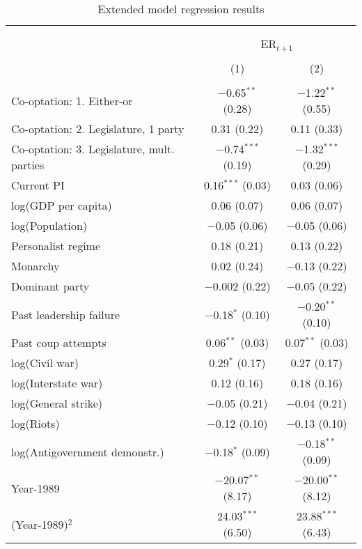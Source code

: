 
\begin{table}[!htbp] \centering 
  \caption{Extended model regression results} 
  \label{tbl:olsExtension} 
\scriptsize 
\begin{tabular}{@{\extracolsep{5pt}}lcc} 
\\[-1.8ex]\hline \\[-1.8ex] 
\\[-1.8ex] & \multicolumn{2}{c}{ER$_{t+1}$} \\ 
\\[-1.8ex] & (1) & (2)\\ 
\hline \\[-1.8ex] 
 Co-optation: 1. Either-or & $-$0.65$^{**}$ (0.28) & $-$1.22$^{**}$ (0.55) \\ 
  Co-optation: 2. Legislature, 1 party & 0.31 (0.22) & 0.11 (0.33) \\ 
  Co-optation: 3. Legislature, mult. parties & $-$0.74$^{***}$ (0.19) & $-$1.32$^{***}$ (0.29) \\ 
  Current PI & 0.16$^{***}$ (0.03) & 0.03 (0.06) \\ 
  log(GDP per capita) & 0.06 (0.07) & 0.06 (0.07) \\ 
  log(Population) & $-$0.05 (0.06) & $-$0.05 (0.06) \\ 
  Personalist regime & 0.18 (0.21) & 0.13 (0.22) \\ 
  Monarchy & 0.02 (0.24) & $-$0.13 (0.22) \\ 
  Dominant party & $-$0.002 (0.22) & $-$0.05 (0.22) \\ 
  Past leadership failure & $-$0.18$^{*}$ (0.10) & $-$0.20$^{**}$ (0.10) \\ 
  Past coup attempts & 0.06$^{**}$ (0.03) & 0.07$^{**}$ (0.03) \\ 
  log(Civil war) & 0.29$^{*}$ (0.17) & 0.27 (0.17) \\ 
  log(Interstate war) & 0.12 (0.16) & 0.18 (0.16) \\ 
  log(General strike) & $-$0.05 (0.21) & $-$0.04 (0.21) \\ 
  log(Riots) & $-$0.12 (0.10) & $-$0.13 (0.10) \\ 
  log(Antigovernment demonstr.) & $-$0.18$^{*}$ (0.09) & $-$0.18$^{**}$ (0.09) \\ 
  Year-1989 & $-$20.07$^{**}$ (8.17) & $-$20.00$^{**}$ (8.12) \\ 
  (Year-1989)$^2$ & 24.03$^{***}$ (6.50) & 23.88$^{***}$ (6.43) \\ 

\end{tabular}
\end{table}
